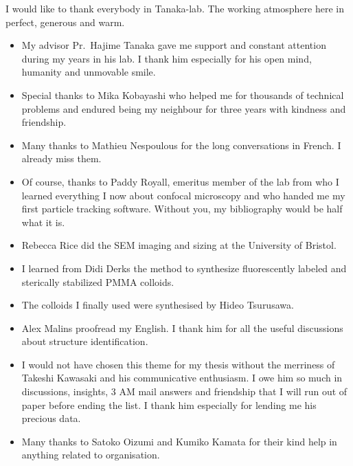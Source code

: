 
I would like to thank everybody in Tanaka-lab. The working atmosphere here in perfect, generous and warm. 
\begin{itemize}
	\item My advisor Pr.~Hajime Tanaka gave me support and constant attention during my years in his lab. I thank him especially for his open mind, humanity and unmovable smile.
	\item Special thanks to Mika Kobayashi who helped me for thousands of technical problems and endured being my neighbour for three years with kindness and friendship. 
	\item Many thanks to Mathieu Nespoulous for the long conversations in French. I already miss them. 
	\item Of course, thanks to Paddy Royall, emeritus member of the lab from who I learned everything I now about confocal microscopy and who handed me my first particle tracking software. Without you, my bibliography would be half what it is.
	\item Rebecca Rice did the \ac{SEM} imaging and sizing at the University of Bristol.
	\item I learned from Didi Derks the method to synthesize fluorescently labeled and sterically stabilized \ac{PMMA} colloids.
	\item The colloids I finally used were synthesised by Hideo Tsurusawa.
	\item Alex Malins proofread my English. I thank him for all the useful discussions about structure identification.
	\item I would not have chosen this theme for my thesis without the merriness of Takeshi Kawasaki and his communicative enthusiasm. I owe him so much in discussions, insights, 3 AM mail answers and friendship that I will run out of paper before ending the list. I thank him especially for lending me his precious data.
	\item Many thanks to Satoko Oizumi and Kumiko Kamata for their kind help in anything related to organisation.
\end{itemize}

